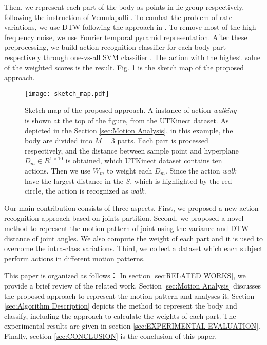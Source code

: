 \documentclass[conference]{IEEEtran}
\begin{document}
Then, we represent each part of the body as points in lie group respectively, following the instruction of Vemulapalli \cite{lie_group}.
To combat the problem of rate variations, we use DTW following the approach in \cite{Rate_invariant}.
To remove most of the high-frequency noise, we use Fourier temporal pyramid representation\cite{fourier_temporal_pyramid}.
After these preprocessing, we build action recognition classifier for each body part respectively through one-vs-all SVM classifier \cite{prml}.
The action with the highest value of the weighted scores is the result.
Fig. \ref{fig:sketch map} is the sketch map of the proposed approach.

\begin{figure}[htbp]
	\centering
	\texttt{[image: sketch\_map.pdf]}
	\caption{Sketch map of the proposed approach. A instance of action \textit{walking} is shown at the top of the figure, from the UTKinect dataset. As depicted in the Section \ref{sec:Motion Analysis}, in this example, the body are divided into $ M=3 $ parts. Each part is processed respectively, and the distance between sample point and hyperplane $ D_{m}\in R^{1\times 10} $ is obtained, which UTKinect dataset contains ten actions. Then we use $ W_{m} $ to weight each $ D_{m} $. Since the action \textit{walk} have the largest distance in the $ S $, which is highlighted by the red circle, the action is recognized as \textit{walk}.}
	\label{fig:sketch map}
\end{figure}

Our main contribution consists of three aspects.
First, we proposed a new action recognition approach based on joints partition.
Second, we proposed a novel method to represent the motion pattern of joint using the variance and DTW distance of joint angles.
We also compute the weight of each part and it is used to overcome the intra-class variations.
Third, we collect a dataset which each subject perform actions in different motion patterns.

This paper is organized as follows：
In section \ref{sec:RELATED WORKS}, we provide a brief review of the related work.
Section \ref{sec:Motion Analysis}  discusses the proposed approach to represent the motion pattern and analyses it;
Section \ref{sec:Algorithm Description} depicts the method to represent the body and classify, including the approach to calculate the weights of each part.
The experimental results are given in section \ref{sec:EXPERIMENTAL EVALUATION}.
Finally, section \ref{sec:CONCLUSION} is the conclusion of this paper.
\end{document}
